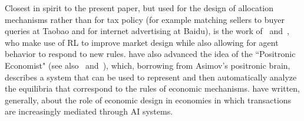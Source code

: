 Closest in spirit to the present paper, but used for the design of allocation mechanisms  rather than for tax policy (for example matching sellers to buyer queries at Taobao and for internet advertising at Baidu), is the work of~\cite{DBLP:conf/ijcai/Tang17a} and~\cite{shen20}, who make use of RL to improve market design while also allowing for agent behavior to respond to new rules.
\cite{DBLP:conf/aaai/ThompsonNL17} have also advanced the idea of the ``Positronic Economist" (see also~\cite{DBLP:journals/aamas/VorobeychikRW12} and~\cite{DBLP:conf/sigecom/BunzLS18}), which, borrowing from Asimov's positronic brain, describes a system that can be used to represent and then automatically analyze the equilibria that correspond to the rules of economic mechanisms. \cite{parkes_economic_2015} have written, generally, about the role of economic design in economies in which transactions are increasingly mediated through AI systems.
